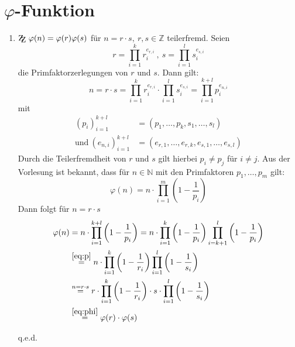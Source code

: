 \documentclass[DIN, pagenumber=false, fontsize=11pt, parskip=half]{scrartcl}
\newcommand{\Z}[0]{\mathbb{Z}}
\newcommand{\N}[0]{\mathbb{N}}
\newcommand{\ZZ}{\mathrm{Z\kern-.3em\raise-0.5ex\hbox{Z}}}
\begin{document}
    \section{$\varphi$-Funktion}
    \begin{enumerate}[label=\alph*)]
        \item $\ZZ \ \varphi(n) = \varphi(r) \varphi(s)$ für $n = r \cdot s, \ r, s \in \Z$ teilerfremd.
        Seien
        \begin{equation*}
            r = \prod_{i=1}^k{r_i^{e_{r,i}}} \ , \ s = \prod_{i=1}^l{s_i^{e_{s,i}}}
        \end{equation*}
        die Primfaktorzerlegungen von $r$ und $s$. Dann gilt:
        \begin{equation*}
            n = r \cdot s = \prod_{i=1}^k{r_i^{e_{r,i}}} \cdot \prod_{i=1}^l{s_i^{e_{s,i}}} = \prod_{i=1}^{k+l}{p_i^{e_{n, i}}}
        \end{equation*}
        mit 
        \begin{align}
            (p_i)_{i=1}^{k+l} &= (p_1, \dots, p_k, s_1, \dots, s_l) \label{eq:p}\\
            \text{und} \ (e_{n,i})_{i=1}^{k+l} &= (e_{r, 1}, \dots, e_{r, k}, e_{s, 1}, \dots, e_{s, l})
        \end{align}
        Durch die Teilerfremdheit von $r$ und $s$ gilt hierbei $p_i \neq p_j$ für $i \neq j$.
        Aus der Vorlesung ist bekannt, dass für $n \in \N$ mit den Primfaktoren $p_1, \dots, p_m$ gilt:
        \begin{equation}
            \varphi(n) = n \cdot \prod_{i=1}^m{\left(1 - \frac{1}{p_i}\right)}
            \label{eq:phi}
        \end{equation}
        Dann folgt für $n = r \cdot s$
        \begin{align*}
            \varphi(n) &= n \cdot \prod_{i = 1}^{k+l}{\left(1 - \frac{1}{p_i}\right)} =
            n \cdot \prod_{i=1}^k{\left(1 - \frac{1}{p_i}\right)} \prod_{i=k+1}^l{\left(1 - \frac{1}{p_i}\right)} \\
            &\stackrel{\ref{eq:p}}{=} n \cdot \prod_{i=1}^k{\left(1 - \frac{1}{r_i}\right)} \prod_{i=1}^l{\left(1 - \frac{1}{s_i}\right)} \\
            & \stackrel{n=r \cdot s}{=} r \cdot \prod_{i=1}^k{\left(1 - \frac{1}{r_i}\right)} \cdot s \cdot \prod_{i=1}^l{\left(1 - \frac{1}{s_i}\right)} \\
            &\stackrel{\ref{eq:phi}}{=} \varphi(r) \cdot \varphi(s)
        \end{align*}
        \begin{flushright}
            q.e.d.
        \end{flushright}


\end{enumerate}
\end{document}
